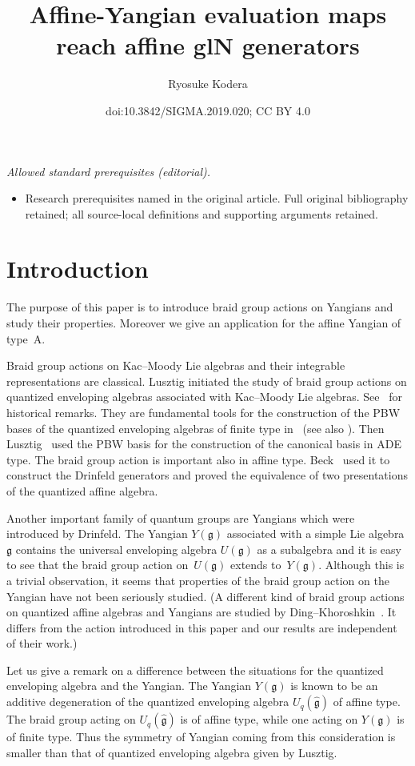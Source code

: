 \documentclass[10pt,a4paper]{amsart}
\title{Affine-Yangian evaluation maps reach affine glN generators}
\author{Ryosuke Kodera}
\date{doi:10.3842/SIGMA.2019.020; CC BY 4.0}
\theoremstyle{definition}
\numberwithin{equation}{section}
\newcommand{\frakg}{\mathfrak{g}}
\begin{document}
\maketitle
\noindent\textit{Allowed standard prerequisites (editorial).}\begin{itemize}
\item Research prerequisites named in the original article. Full original bibliography retained; all source-local definitions and supporting arguments retained.
\end{itemize}\medskip
\section{Introduction}

The purpose of this paper is to introduce braid group actions on Yangians and study their properties. Moreover we give an application for the affine Yangian of type~A.

Braid group actions on Kac--Moody Lie algebras and their integrable representations are classical. Lusztig initiated the study of braid group actions on quantized enveloping algebras associated with Kac--Moody Lie algebras. See~\cite[notes on Part~VI]{MR1227098} for historical remarks. They are fundamental tools for the construction of the PBW bases of the quantized enveloping algebras of finite type in~\cite{MR1013053, MR1066560} (see also \cite{MR1081014,MR1120927,MR1265471}). Then Lusztig~\cite{MR1035415} used the PBW basis for the construction of the canonical basis in ADE type. The braid group action is important also in affine type. Beck~\cite{MR1301623} used it to construct the Drinfeld generators and proved the equivalence of two presentations of the quantized affine algebra.

 Another important family of quantum groups are Yangians which were introduced by Drinfeld. The Yangian $Y(\frakg)$ associated with a simple Lie algebra $\frakg$ contains the universal enveloping algebra $U(\frakg)$ as a subalgebra and it is easy to see that the braid group action on~$U(\frakg)$ extends to~$Y(\frakg)$. Although this is a trivial observation, it seems that properties of the braid group action on the Yangian have not been seriously studied. (A different kind of braid group actions on quantized affine algebras and Yangians are studied by Ding--Khoroshkin~\cite{MR1745710}. It differs from the action introduced in this paper and our results are independent of their work.)

 Let us give a remark on a difference between the situations for the quantized enveloping algebra and the Yangian. The Yangian $Y(\frakg)$ is known to be an additive degeneration of the quantized enveloping algebra $U_q(\hat{\frakg})$ of affine type. The braid group acting on $U_q(\hat{\frakg})$ is of affine type, while one acting on $Y(\frakg)$ is of finite type. Thus the symmetry of Yangian coming from this consideration is smaller than that of quantized enveloping algebra given by Lusztig.
\end{document}
